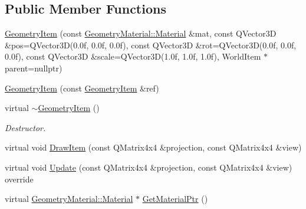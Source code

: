 \subsection*{Public Member Functions}
\begin{DoxyCompactItemize}
\item 
\mbox{\hyperlink{class_geometry_engine_1_1_geometry_world_item_1_1_geometry_item_1_1_geometry_item_a4e952dc4d555e736786b78a79e9f5ad4}{Geometry\+Item}} (const \mbox{\hyperlink{class_geometry_engine_1_1_geometry_material_1_1_material}{Geometry\+Material\+::\+Material}} \&mat, const Q\+Vector3D \&pos=Q\+Vector3D(0.\+0f, 0.\+0f, 0.\+0f), const Q\+Vector3\+D \&rot=\+Q\+Vector3\+D(0.\+0f, 0.\+0f, 0.\+0f), const Q\+Vector3\+D \&scale=\+Q\+Vector3\+D(1.\+0f, 1.\+0f, 1.\+0f), World\+Item $\ast$parent=nullptr)
\item 
\mbox{\hyperlink{class_geometry_engine_1_1_geometry_world_item_1_1_geometry_item_1_1_geometry_item_abf5badf6ed7138295b6a2b635ff1cf53}{Geometry\+Item}} (const \mbox{\hyperlink{class_geometry_engine_1_1_geometry_world_item_1_1_geometry_item_1_1_geometry_item}{Geometry\+Item}} \&ref)
\item 
\mbox{\label{class_geometry_engine_1_1_geometry_world_item_1_1_geometry_item_1_1_geometry_item_abdff890df2d9228d8e0164e6406e82b2}} 
virtual \mbox{\hyperlink{class_geometry_engine_1_1_geometry_world_item_1_1_geometry_item_1_1_geometry_item_abdff890df2d9228d8e0164e6406e82b2}{$\sim$\+Geometry\+Item}} ()
\begin{DoxyCompactList}\small\item\em Destructor. \end{DoxyCompactList}\item 
virtual void \mbox{\hyperlink{class_geometry_engine_1_1_geometry_world_item_1_1_geometry_item_1_1_geometry_item_a263a106b8c225c7e30f2788fb4a3e4bc}{Draw\+Item}} (const Q\+Matrix4x4 \&projection, const Q\+Matrix4x4 \&view)
\item 
virtual void \mbox{\hyperlink{class_geometry_engine_1_1_geometry_world_item_1_1_geometry_item_1_1_geometry_item_aa07c13861cf4aef269442071e4150389}{Update}} (const Q\+Matrix4x4 \&projection, const Q\+Matrix4x4 \&view) override
\item 
virtual \mbox{\hyperlink{class_geometry_engine_1_1_geometry_material_1_1_material}{Geometry\+Material\+::\+Material}} $\ast$ \mbox{\hyperlink{class_geometry_engine_1_1_geometry_world_item_1_1_geometry_item_1_1_geometry_item_a2987613e4509c7748b72a76ccfe9babe}{Get\+Material\+Ptr}} ()

\end{DoxyCompactItemize}
